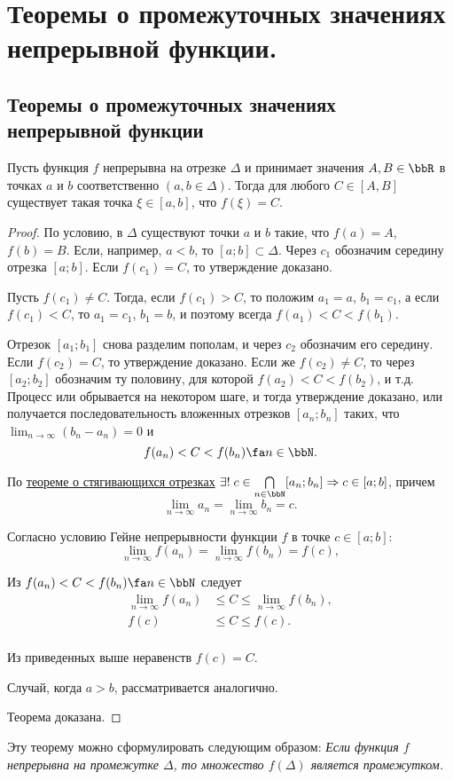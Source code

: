 \chapter{Теоремы о промежуточных значениях непрерывной функции.}
\section{Теоремы о промежуточных значениях непрерывной функции}

\begin{thm}  \label{ch3n2}
Пусть функция $f$ непрерывна на отрезке $\Delta$ и принимает значения $A,B \in \bbR$ в точках $a$ и $b$ соответственно $(a,b \in \Delta )$. Тогда для любого $C\in[A,B]$ существует такая точка $\xi \in [a,b]$, что $f(\xi)=C$.
\end{thm}
\begin{proof}
По условию, в $\Delta$ существуют точки $a$ и $b$ такие, что $f(a) = A$, $f(b) = B$. Если, например, $a < b$, то $[a; b] \subset \Delta$.
Через $c_1$ обозначим середину отрезка $[a;b]$. Если $f(c_1) = C$, то утверждение доказано.

Пусть $f(c_1)\ne C$. Тогда, если $f(c_1) > C$, то положим $a_1 = a$, $b_1 = c_1$, а если $f(c_1) < C$, то $a_1 = c_1$, $b_1 = b$, и поэтому всегда $f(a_1)<C<f(b_1)$.

Отрезок $[a_1; b_1]$ снова разделим пополам, и через $c_2$ обозначим его середину. Если $f(c_2) = C$, то утверждение доказано. Если же $f(c_2) \ne C$, то через $[a_2;b_2]$ обозначим ту половину, для которой $f(a_2) < C < f(b_2)$, и т.д. Процесс или обрывается на некотором шаге, и тогда утверждение доказано, или получается последовательность вложенных отрезков $[a_n;b_n]$ таких, что $\lim_{n \to \infty}\limits(b_n-a_n)=0$ и
$$
f(a_n)<C<f(b_n) \fa n\in \bbN.
$$

По \hyperref[exp3]{теореме о стягивающихся отрезках} $\exists!\; c \in \bigcap_{n \in \bbN}\limits[a_n;b_n] \Rightarrow c\in [a;b]$, причем 
$$
\lim_{n \to \infty}a_n = \lim_{n \to \infty}b_n = c.
$$

Согласно условию Гейне непрерывности функции $f$ в точке $c\in[a;b]$:
$$
\lim_{n \to \infty}f(a_n) = \lim_{n \to \infty}f(b_n) = f(c),
$$

Из $f(a_n)<C<f(b_n) \fa n\in\bbN$ следует 
\begin{equation*}
\begin{split}
\lim_{n \to \infty}f(a_n) &\le C \le \lim_{n \to \infty}f(b_n),\\
f(c)&\le C\le f(c).\\
\end{split}
\end{equation*}

Из приведенных выше неравенств $f(c)=C$.

Случай, когда $a > b$, рассматривается аналогично. 

\noindent 
Теорема доказана.
\end{proof}
Эту теорему можно сформулировать следующим образом:	\textit{Если функция
$f$ непрерывна на промежутке $\Delta$, то множество $f(\Delta)$ является промежутком.}

